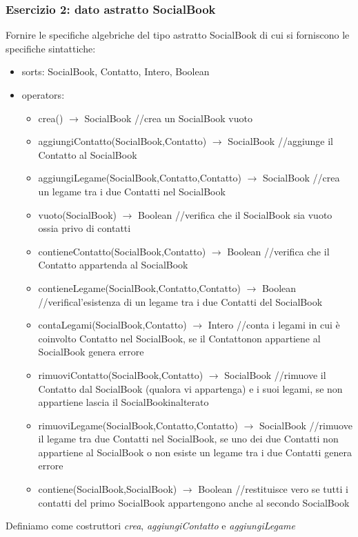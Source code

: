 \documentclass{article}
\begin{document}
	\subsubsection*{Esercizio 2: dato astratto SocialBook}
	Fornire le specifiche algebriche del tipo astratto SocialBook di cui si forniscono le specifiche sintattiche:
	\begin{itemize}
		\item sorts: SocialBook, Contatto, Intero, Boolean
		\item operators:
		\begin{itemize}
			\item crea() $\rightarrow$ SocialBook //crea un SocialBook vuoto
			\item aggiungiContatto(SocialBook,Contatto) $\rightarrow$ SocialBook //aggiunge il Contatto al SocialBook
			\item aggiungiLegame(SocialBook,Contatto,Contatto) $\rightarrow$ SocialBook //crea un legame tra i due Contatti nel SocialBook
			\item vuoto(SocialBook) $\rightarrow$ Boolean //verifica che il SocialBook sia vuoto ossia privo di contatti
			\item contieneContatto(SocialBook,Contatto) $\rightarrow$ Boolean //verifica che il Contatto appartenda al SocialBook
			\item contieneLegame(SocialBook,Contatto,Contatto) $\rightarrow$ Boolean //verifical'esistenza di un legame tra i due Contatti del SocialBook
			\item contaLegami(SocialBook,Contatto) $\rightarrow$ Intero //conta i legami in cui è coinvolto Contatto nel SocialBook, se il Contattonon appartiene al SocialBook genera errore
			\item rimuoviContatto(SocialBook,Contatto) $\rightarrow$ SocialBook //rimuove il Contatto dal SocialBook (qualora vi appartenga) e i suoi legami, se non appartiene lascia il SocialBookinalterato
			\item rimuoviLegame(SocialBook,Contatto,Contatto) $\rightarrow$ SocialBook //rimuove il legame tra due Contatti nel SocialBook, se uno dei due Contatti non appartiene al SocialBook o non esiste un legame tra i due Contatti genera errore
			\item contiene(SocialBook,SocialBook) $\rightarrow$ Boolean //restituisce vero se tutti i contatti del primo SocialBook appartengono anche al secondo SocialBook
		\end{itemize}
	\end{itemize}	
	Definiamo come costruttori \textit{crea}, \textit{aggiungiContatto} e \textit{aggiungiLegame}
\end{document}
